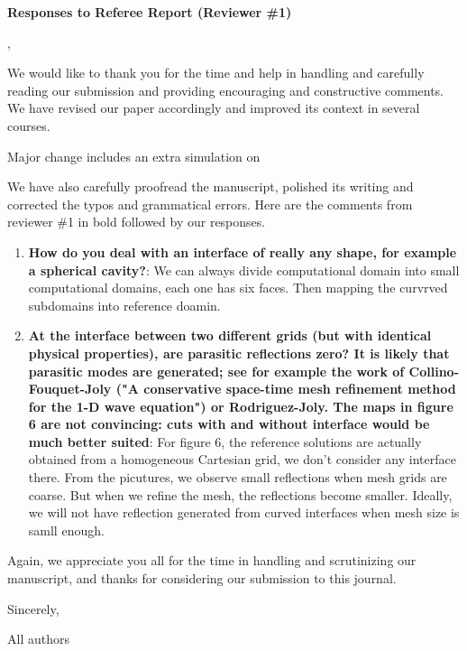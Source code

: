 \documentclass[twoside,11pt]{article}
\begin{document}
\begin{center}
{\Large \textbf{Responses to Referee Report (Reviewer \#1)}}
\end{center}

,

We would like to thank you for the time and help in handling and carefully reading our submission and providing encouraging and constructive comments.  We have revised our paper accordingly and improved its context in several courses. 

Major change includes an extra simulation on

We have also carefully proofread the manuscript, polished its writing and corrected the typos and grammatical errors.  Here are the comments from reviewer \#1 in bold followed by our responses.

\begin{enumerate}
\item \textbf{How do you deal with an interface of really any shape, for example a spherical cavity?}: We can always divide computational domain into small computational domains, each one has six faces. Then mapping the curvrved subdomains into reference doamin.

\item  \textbf{At the interface between two different grids (but with identical physical properties), are parasitic reflections zero? It is likely that parasitic modes are generated; see for example the work of Collino-Fouquet-Joly ("A conservative space-time mesh refinement method for the 1-D wave equation") or Rodriguez-Joly. The maps in figure 6 are not convincing: cuts with and without interface would be much better suited}: For figure 6, the reference solutions are actually obtained from a homogeneous Cartesian grid, we don't consider any interface there. From the picutures, we observe small reflections when mesh grids are coarse. But when we refine the mesh, the reflections become smaller. Ideally, we will not have reflection generated from curved interfaces when mesh size is samll enough. 

\end{enumerate}

Again, we appreciate you all for the time in handling and scrutinizing our manuscript, and thanks for considering our submission to this journal.

Sincerely, 

All authors
\end{document}
